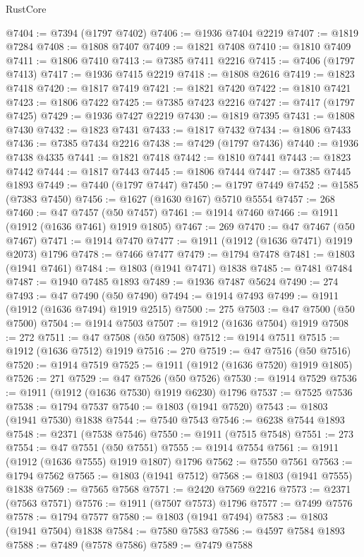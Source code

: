 \begin{lexlean}{RustCore}
\begin{coremodule}
@7404 := @7394 (@1797 @7402)
@7406 := @1936 @7404 @2219
@7407 := @1819 @7284
@7408 := @1808 @7407
@7409 := @1821 @7408
@7410 := @1810 @7409
@7411 := @1806 @7410
@7413 := @7385 @7411 @2216
@7415 := @7406 (@1797 @7413)
@7417 := @1936 @7415 @2219
@7418 := @1808 @2616
@7419 := @1823 @7418
@7420 := @1817 @7419
@7421 := @1821 @7420
@7422 := @1810 @7421
@7423 := @1806 @7422
@7425 := @7385 @7423 @2216
@7427 := @7417 (@1797 @7425)
@7429 := @1936 @7427 @2219
@7430 := @1819 @7395
@7431 := @1808 @7430
@7432 := @1823 @7431
@7433 := @1817 @7432
@7434 := @1806 @7433
@7436 := @7385 @7434 @2216
@7438 := @7429 (@1797 @7436)
@7440 := @1936 @7438 @4335
@7441 := @1821 @7418
@7442 := @1810 @7441
@7443 := @1823 @7442
@7444 := @1817 @7443
@7445 := @1806 @7444
@7447 := @7385 @7445 @1893
@7449 := @7440 (@1797 @7447)
@7450 := @1797 @7449
@7452 := @1585 (@7383 @7450)
@7456 := @1627 (@1630 @167) @5710 @5554
@7457 := 268
@7460 := @47 @7457 (@50 @7457)
@7461 := @1914 @7460
@7466 := @1911 (@1912 (@1636 @7461) @1919 @1805)
@7467 := 269
@7470 := @47 @7467 (@50 @7467)
@7471 := @1914 @7470
@7477 := @1911 (@1912 (@1636 @7471) @1919 @2073) @1796
@7478 := @7466 @7477
@7479 := @1794 @7478
@7481 := @1803 (@1941 @7461)
@7484 := @1803 (@1941 @7471) @1838
@7485 := @7481 @7484
@7487 := @1940 @7485 @1893
@7489 := @1936 @7487 @5624
@7490 := 274
@7493 := @47 @7490 (@50 @7490)
@7494 := @1914 @7493
@7499 := @1911 (@1912 (@1636 @7494) @1919 @2515)
@7500 := 275
@7503 := @47 @7500 (@50 @7500)
@7504 := @1914 @7503
@7507 := @1912 (@1636 @7504) @1919
@7508 := 272
@7511 := @47 @7508 (@50 @7508)
@7512 := @1914 @7511
@7515 := @1912 (@1636 @7512) @1919
@7516 := 270
@7519 := @47 @7516 (@50 @7516)
@7520 := @1914 @7519
@7525 := @1911 (@1912 (@1636 @7520) @1919 @1805)
@7526 := 271
@7529 := @47 @7526 (@50 @7526)
@7530 := @1914 @7529
@7536 := @1911 (@1912 (@1636 @7530) @1919 @6230) @1796
@7537 := @7525 @7536
@7538 := @1794 @7537
@7540 := @1803 (@1941 @7520)
@7543 := @1803 (@1941 @7530) @1838
@7544 := @7540 @7543
@7546 := @6238 @7544 @1893
@7548 := @2371 (@7538 @7546)
@7550 := @1911 (@7515 @7548)
@7551 := 273
@7554 := @47 @7551 (@50 @7551)
@7555 := @1914 @7554
@7561 := @1911 (@1912 (@1636 @7555) @1919 @1807) @1796
@7562 := @7550 @7561
@7563 := @1794 @7562
@7565 := @1803 (@1941 @7512)
@7568 := @1803 (@1941 @7555) @1838
@7569 := @7565 @7568
@7571 := @2420 @7569 @2216
@7573 := @2371 (@7563 @7571)
@7576 := @1911 (@7507 @7573) @1796
@7577 := @7499 @7576
@7578 := @1794 @7577
@7580 := @1803 (@1941 @7494)
@7583 := @1803 (@1941 @7504) @1838
@7584 := @7580 @7583
@7586 := @4597 @7584 @1893
@7588 := @7489 (@7578 @7586)
@7589 := @7479 @7588

\end{coremodule}
\end{lexlean}
